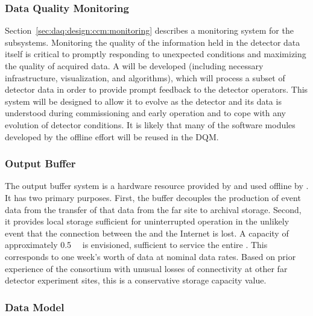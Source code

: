 \subsubsection{Data Quality Monitoring}
\label{sec:fd-daq:design-data-quality}

Section~\ref{sec:daq:design:ccm:monitoring} describes a monitoring system for the  subsystems. 
Monitoring the quality of the information held in the detector data itself is critical to promptly responding to unexpected conditions and maximizing the quality of acquired data. 
A   
will be developed (including necessary infrastructure, visualization,
and algorithms), which will process a subset of detector data in order
to provide prompt feedback to the detector operators. 
This system will be designed to allow it to evolve as the detector and its data is understood during commissioning and early operation and to cope with any evolution of detector conditions.
It is likely that many of the software modules developed by the
offline effort will be reused in the DQM.

\subsubsection{Output Buffer}


The output buffer system is a hardware resource provided by  and used offline by . 
It has two primary purposes. 
First, the buffer decouples the production of event data from the transfer of that data from the far site to archival storage.
Second, it provides local storage sufficient for uninterrupted  operation in the unlikely event that the connection between the  and the Internet is lost. 
A capacity of approximately \SI{0.5}{\peta\byte} is envisioned,
sufficient to service the entire . This corresponds to one
week's worth of data at nominal data rates. Based on prior experience
of the consortium with unusual losses of 
connectivity at other far detector experiment sites, this is a
conservative storage capacity value.

\subsubsection{Data Model}
\label{sec:fd-daq:design-data-model}

